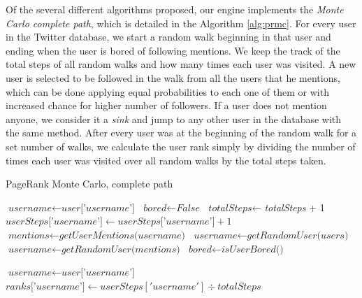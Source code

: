 Of the several different algorithms proposed, our engine implements the \emph{Monte Carlo complete path},   which is detailed in the Algorithm \ref{alg:prmc}. For every user in the Twitter database, we start a random walk beginning in that user and ending when the user is bored of following mentions. We keep the track of the total steps of all random walks and how many times each user was visited. A new user is selected to be followed in the walk from all the users that he mentions, which can be done applying equal probabilities to each one of them or with increased chance for higher number of followers. If a user does not mention anyone, we consider it a \emph{sink} and jump to any other user in the database with the same method. After every user was at the beginning of the random walk for a set number of walks, we calculate the user rank simply by dividing the number of times each user was visited over all random walks by the total steps taken.   

\begin{algorithm}
\caption{PageRank Monte Carlo, complete path}\label{alg:prmc}
\begin{algorithmic}[1]
	\State $\textit{username} \gets \textit{user['username']}$
    \State $\textit{bored} \gets \textit{False}$
		\State $\textit{totalSteps} \gets $\textit{totalSteps} + 1
        \State $\textit{userSteps['username']} \gets \textit{userSteps['username']} + 1$
        \State $\textit{mentions} \gets \textit{getUserMentions(username)}$
        	\State $\textit{username} \gets \textit{getRandomUser(users)}$         
        \Else
     		\State $\textit{username} \gets \textit{getRandomUser(mentions)}$
        \EndIf
        \State $\textit{bored} \gets \textit{isUserBored()}$ 
    \EndWhile
\EndFor
\EndFor

	\State $\textit{username} \gets \textit{user['username']}$
	\State $\textit{ranks['username']} \gets userSteps['username'] \div totalSteps $
\EndFor

\State {}

\EndProcedure
\end{algorithmic}
\end{algorithm}
